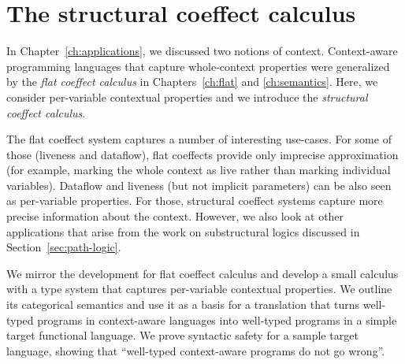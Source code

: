 \chapter{The structural coeffect calculus}
\label{ch:structural}

In Chapter~\ref{ch:applications}, we discussed two notions of context. Context-aware programming
languages that capture whole-context properties were generalized by the \emph{flat coeffect
calculus} in Chapters~\ref{ch:flat} and \ref{ch:semantics}. Here, we consider per-variable
contextual properties and we introduce the \emph{structural coeffect calculus}.

The flat coeffect system captures a number of interesting use-cases. For some of those (liveness
and dataflow), flat coeffects provide only imprecise approximation (for example, marking the whole
context as live rather than marking individual variables). Dataflow and liveness (but not implicit
parameters) can be also seen as per-variable properties. For those, structural coeffect systems
capture more precise information about the context. However, we also look at other applications
that arise from the work on substructural logics discussed in Section~\ref{sec:path-logic}.

We mirror the development for flat coeffect calculus and develop a small calculus with a type system
that captures per-variable contextual properties. We outline its categorical semantics and use it as
a basis for a translation that turns well-typed programs in context-aware languages into well-typed
programs in a simple target functional language. We prove syntactic safety for a sample target
language, showing that ``well-typed context-aware programs do not go wrong''.

